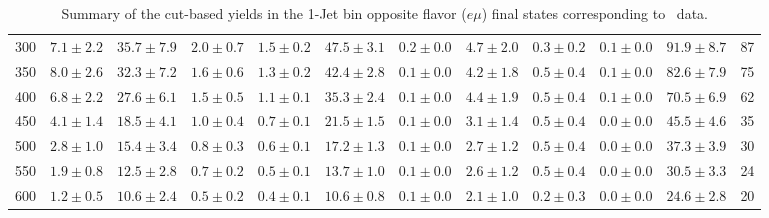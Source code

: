 \begin{table}
{\begin{center}
\begin{tabular}{l c c c c c c c c c c c }
300 & $7.1\pm2.2$ & $35.7\pm7.9$ & $2.0\pm0.7$ & $1.5\pm0.2$ & $47.5\pm3.1$ & $0.2\pm0.0$ & $4.7\pm2.0$ & $0.3\pm0.2$ & $0.1\pm0.0$ & $91.9\pm8.7$ & 87 \\
350 & $8.0\pm2.6$ & $32.3\pm7.2$ & $1.6\pm0.6$ & $1.3\pm0.2$ & $42.4\pm2.8$ & $0.1\pm0.0$ & $4.2\pm1.8$ & $0.5\pm0.4$ & $0.1\pm0.0$ & $82.6\pm7.9$ & 75 \\
400 & $6.8\pm2.2$ & $27.6\pm6.1$ & $1.5\pm0.5$ & $1.1\pm0.1$ & $35.3\pm2.4$ & $0.1\pm0.0$ & $4.4\pm1.9$ & $0.5\pm0.4$ & $0.1\pm0.0$ & $70.5\pm6.9$ & 62 \\
450 & $4.1\pm1.4$ & $18.5\pm4.1$ & $1.0\pm0.4$ & $0.7\pm0.1$ & $21.5\pm1.5$ & $0.1\pm0.0$ & $3.1\pm1.4$ & $0.5\pm0.4$ & $0.0\pm0.0$ & $45.5\pm4.6$ & 35 \\
500 & $2.8\pm1.0$ & $15.4\pm3.4$ & $0.8\pm0.3$ & $0.6\pm0.1$ & $17.2\pm1.3$ & $0.1\pm0.0$ & $2.7\pm1.2$ & $0.5\pm0.4$ & $0.0\pm0.0$ & $37.3\pm3.9$ & 30 \\
550 & $1.9\pm0.8$ & $12.5\pm2.8$ & $0.7\pm0.2$ & $0.5\pm0.1$ & $13.7\pm1.0$ & $0.1\pm0.0$ & $2.6\pm1.2$ & $0.5\pm0.4$ & $0.0\pm0.0$ & $30.5\pm3.3$ & 24 \\
600 & $1.2\pm0.5$ & $10.6\pm2.4$ & $0.5\pm0.2$ & $0.4\pm0.1$ & $10.6\pm0.8$ & $0.1\pm0.0$ & $2.1\pm1.0$ & $0.2\pm0.3$ & $0.0\pm0.0$ & $24.6\pm2.8$ & 20 \\
\hline
\end{tabular}
\end{center}
}
\caption{Summary of the cut-based yields in the 1-Jet bin opposite flavor ($e\mu$) final states corresponding to \intlumi\ data.}
\end{table}
